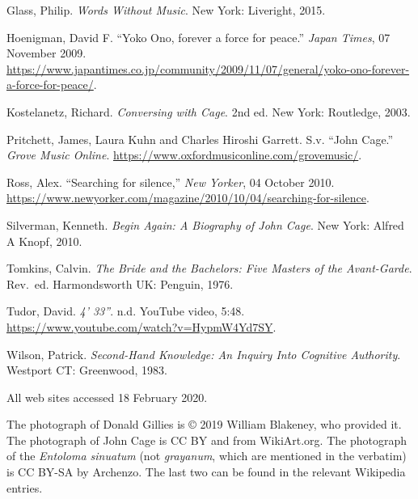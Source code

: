\begin{mybiblist}
\item Glass, Philip.  \textit{Words Without Music}.  New York: Liveright, 2015.

\item Hoenigman, David F.  ``Yoko Ono, forever a force for peace.'' \textit{Japan Times}, 07 November 2009. \url{https://www.japantimes.co.jp/community/2009/11/07/general/yoko-ono-forever-a-force-for-peace/}.

\item Kostelanetz, Richard.  \textit{Conversing with Cage}.  2nd ed.  New York: Routledge, 2003.


\item Pritchett, James, Laura Kuhn and Charles Hiroshi Garrett.  S.v. ``John Cage.''  \textit{Grove Music Online}. \url{https://www.oxfordmusiconline.com/grovemusic/}.

\item Ross, Alex.  ``Searching for silence,'' \textit{New Yorker}, 04 October 2010.  \url{https://www.newyorker.com/magazine/2010/10/04/searching-for-silence}.

\item Silverman, Kenneth. \textit{Begin Again: A Biography of John Cage}. New York: Alfred A Knopf, 2010.

\item Tomkins, Calvin.  \textit{The Bride and the Bachelors: Five Masters of the Avant-Garde}.  Rev.\ ed.  Harmondsworth UK: Penguin, 1976.

\item Tudor, David. \textit{4' 33''}.  n.d.  YouTube video, 5:48.  \url{https://www.youtube.com/watch?v=HypmW4Yd7SY}.

\item Wilson, Patrick.  \textit{Second-Hand Knowledge: An Inquiry Into Cognitive Authority}.  Westport CT: Greenwood, 1983.

\end{mybiblist}

All web sites accessed 18 February 2020.

The photograph of Donald Gillies is © 2019 William Blakeney, who provided it.  The photograph of John Cage is CC BY and from WikiArt.org.  The photograph of the \textit{Entoloma sinuatum} (not \textit{grayanum}, which are mentioned in the verbatim) is CC BY-SA by Archenzo.  The last two can be found in the relevant Wikipedia entries.

